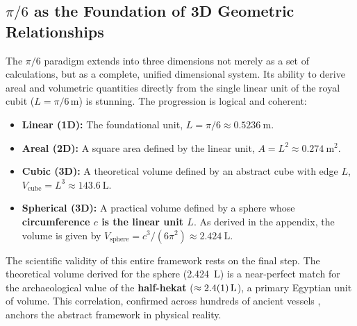 \documentclass[11pt]{article}
\begin{document}
\subsection{\texorpdfstring{$\pi/6$}{pi/6} as the Foundation of 3D Geometric Relationships}
\label{sec:3D_volume_basel}
The $\pi/6$ paradigm extends into three dimensions not merely as a set of calculations, but as a complete, unified dimensional system. Its ability to derive areal and volumetric quantities directly from the single linear unit of the royal cubit ($L = \pi/6\,\text{m}$) is stunning. The progression is logical and coherent:
\begin{itemize}
    \item \textbf{Linear (1D):} The foundational unit, \textbf{$L = \pi/6 \approx \SI{0.5236}{\meter}$}.
    \item \textbf{Areal (2D):} A square area defined by the linear unit, \textbf{$A = L^2 \approx \SI{0.274}{\meter\squared}$}.
    \item \textbf{Cubic (3D):} A theoretical volume defined by an abstract cube with edge $L$, \textbf{$V_{\text{cube}} = L^3 \approx \SI{143.6}{\liter}$}.
    \item \textbf{Spherical (3D):} A practical volume defined by a sphere whose \textbf{circumference $c$ is the linear unit $L$}. As derived in the appendix, the volume is given by \textbf{$V_{\text{sphere}} = c^3 / (6\pi^2) \approx \SI{2.424}{\liter}$}.
\end{itemize}
The scientific validity of this entire framework rests on the final step. The theoretical volume derived for the sphere (\SI{2.424}{\liter}) is a near-perfect match for the archaeological value of the \textbf{half-hekat} ($\approx \SI{2.4 \pm 0.1}{\liter}$), a primary Egyptian unit of volume. This correlation, confirmed across hundreds of ancient vessels \cite{zapassky2012ancient}, anchors the abstract framework in physical reality.
\end{document}
